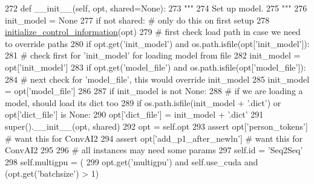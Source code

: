 \begin{DoxyCode}
272     \textcolor{keyword}{def }\_\_init\_\_(self, opt, shared=None):
273         \textcolor{stringliteral}{"""}
274 \textcolor{stringliteral}{        Set up model.}
275 \textcolor{stringliteral}{        """}
276         init\_model = \textcolor{keywordtype}{None}
277         \textcolor{keywordflow}{if} \textcolor{keywordflow}{not} shared:  \textcolor{comment}{# only do this on first setup}
278             \hyperlink{namespaceprojects_1_1controllable__dialogue_1_1controllable__seq2seq_1_1controls_aafbe257df1791349439cc63c99de8b5e}{initialize\_control\_information}(opt)
279             \textcolor{comment}{# first check load path in case we need to override paths}
280             \textcolor{keywordflow}{if} opt.get(\textcolor{stringliteral}{'init\_model'}) \textcolor{keywordflow}{and} os.path.isfile(opt[\textcolor{stringliteral}{'init\_model'}]):
281                 \textcolor{comment}{# check first for 'init\_model' for loading model from file}
282                 init\_model = opt[\textcolor{stringliteral}{'init\_model'}]
283             \textcolor{keywordflow}{if} opt.get(\textcolor{stringliteral}{'model\_file'}) \textcolor{keywordflow}{and} os.path.isfile(opt[\textcolor{stringliteral}{'model\_file'}]):
284                 \textcolor{comment}{# next check for 'model\_file', this would override init\_model}
285                 init\_model = opt[\textcolor{stringliteral}{'model\_file'}]
286 
287             \textcolor{keywordflow}{if} init\_model \textcolor{keywordflow}{is} \textcolor{keywordflow}{not} \textcolor{keywordtype}{None}:
288                 \textcolor{comment}{# if we are loading a model, should load its dict too}
289                 \textcolor{keywordflow}{if} os.path.isfile(init\_model + \textcolor{stringliteral}{'.dict'}) \textcolor{keywordflow}{or} opt[\textcolor{stringliteral}{'dict\_file'}] \textcolor{keywordflow}{is} \textcolor{keywordtype}{None}:
290                     opt[\textcolor{stringliteral}{'dict\_file'}] = init\_model + \textcolor{stringliteral}{'.dict'}
291         super().\_\_init\_\_(opt, shared)
292         opt = self.opt
293         \textcolor{keyword}{assert} opt[\textcolor{stringliteral}{'person\_tokens'}]  \textcolor{comment}{# want this for ConvAI2}
294         \textcolor{keyword}{assert} opt[\textcolor{stringliteral}{'add\_p1\_after\_newln'}]  \textcolor{comment}{# want this for ConvAI2}
295 
296         \textcolor{comment}{# all instances may need some params}
297         self.id = \textcolor{stringliteral}{'Seq2Seq'}
298         self.multigpu = (
299             opt.get(\textcolor{stringliteral}{'multigpu'}) \textcolor{keywordflow}{and} self.use\_cuda \textcolor{keywordflow}{and} (opt.get(\textcolor{stringliteral}{'batchsize'}) > 1)

\end{DoxyCode}
